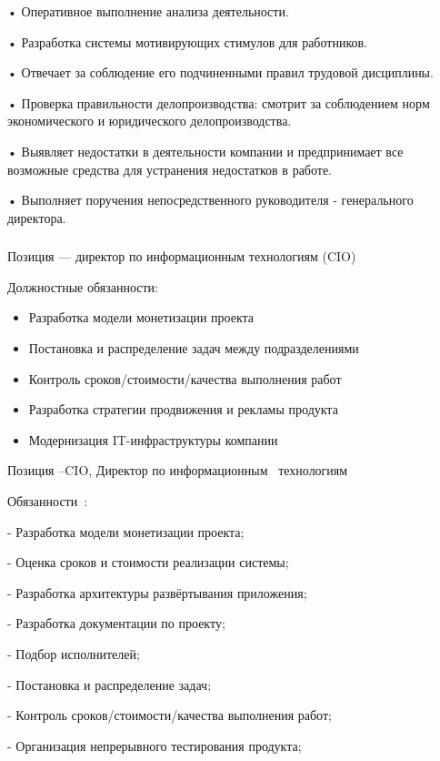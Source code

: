 \documentclass{../industrial-development}
\begin{document}
•	Оперативное выполнение анализа деятельности. 

•	Разработка системы мотивирующих стимулов для работников. 

•	Отвечает за соблюдение его подчиненными правил трудовой дисциплины. 

•	Проверка правильности делопроизводства: смотрит за соблюдением норм экономического и юридического делопроизводства.

•	 Выявляет недостатки в деятельности компании и предпринимает все возможные средства для устранения недостатков в работе. 

•	Выполняет поручения непосредственного руководителя - генерального директора. 


\begin{frame} \frametitle{ }
 \begin{block}{}
  \alert{Позиция --- директор по информационным технологиям (CIO)}

Должностные обязанности: 
  \end{block}
  \begin{itemize}
  \item Разработка модели монетизации проекта
  \item Постановка и распределение задач между подразделениями
  \item Контроль сроков/стоимости/качества выполнения работ
  \item Разработка стратегии продвижения и рекламы продукта
  \item Модернизация IT-инфраструктуры компании
  \end{itemize}
\end{frame}

\lecturenotes

	Позиция –CIO, Директор по информационным~\cite{hh} технологиям~\cite{itcf}

Обязанности~\cite{rab}:

- Разработка модели монетизации проекта;

- Оценка сроков и стоимости реализации системы;

- Разработка архитектуры развёртывания приложения;

- Разработка документации по проекту;

- Подбор исполнителей;

- Постановка и распределение задач;

- Контроль сроков/стоимости/качества выполнения работ;

- Организация непрерывного тестирования продукта;
\end{document}
